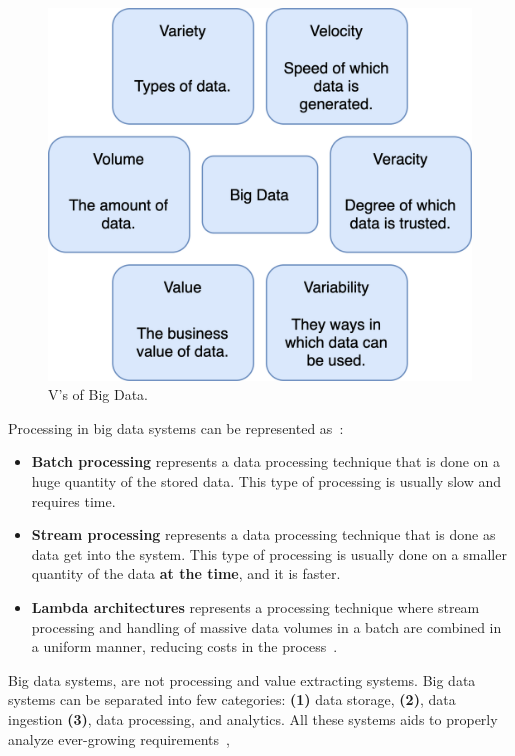 \begin{figure}[H]
	\begin{center}
		\includegraphics[scale=0.7]{images/Figure3.png}
	\end{center}
	\vspace{-0.6cm}
	\caption{V's of Big Data.}
	\label{fig:fig3}
\end{figure}

\noindent
Processing in big data systems can be represented as~\cite{phdthesis, KiranMMDB15}:

\begin{itemize}
	\item \textbf{Batch processing} represents a data processing technique that is done on a huge quantity of the stored data. This type of processing is usually slow and requires time.
	\item \textbf{Stream processing} represents a data processing technique that is done as data get into the system. This type of processing is usually done on a smaller quantity of the data \textbf{at the time}, and it is faster.
	\item \textbf{Lambda architectures} represents a processing technique where stream processing and handling of massive data volumes in a batch are combined in a uniform manner, reducing costs in the process~\cite{KiranMMDB15}.
\end{itemize}

\noindent
Big data systems, are not processing and value extracting systems. Big data systems can be separated into few categories: \textbf{(1)} data storage, \textbf{(2)}, data ingestion \textbf{(3)}, data processing, and analytics. All these systems aids to properly analyze ever-growing requirements~\cite{RaoMBG19},

